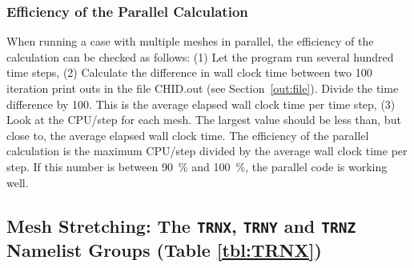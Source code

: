 \documentclass[11pt]{book}
\begin{document}
\subsubsection{Efficiency of the Parallel Calculation}

When running a case with multiple meshes in parallel, the efficiency of the
calculation can be checked as follows: (1) Let the program run several hundred time steps, (2) Calculate
the difference in wall clock time between two 100 iteration print outs in
the file {\ct CHID.out} (see Section~\ref{out:file}).
Divide the time difference by 100. This is the average
elapsed wall clock time per time step, (3) Look at the {\ct CPU/step} for each mesh. The
largest value should be less than, but close to, the average elapsed wall clock time.
The efficiency of the parallel calculation is the maximum {\ct CPU/step} divided by
the average wall clock time per step. If this number is between 90~\% and 100~\%, the
parallel code is working well.



\subsection{Mesh Stretching: The \texorpdfstring{{\tt TRNX}}{TRNX}, \texorpdfstring{{\tt TRNY}}{TRNY} and \texorpdfstring{{\tt TRNZ}}{TRNZ} Namelist Groups (Table \ref{tbl:TRNX})}
\label{info:TRNX}
\end{document}
